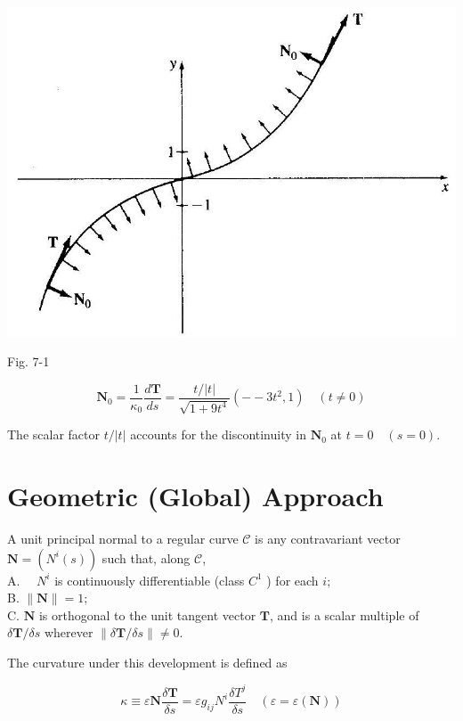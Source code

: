 \documentclass[10pt]{article}
\begin{document}
\begin{center}
\includegraphics[max width=\textwidth]{2024_04_03_41f90be4f896e21f0dc9g-096}
\end{center}

Fig. 7-1

$$
\mathbf{N}_{0}=\frac{1}{\kappa_{0}} \frac{d \mathbf{T}}{d s}=\frac{t /|t|}{\sqrt{1+9 t^{4}}}\left(--3 t^{2}, 1\right) \quad(t \neq 0)
$$

The scalar factor $t /|t|$ accounts for the discontinuity in $\mathbf{N}_{0}$ at $t=0 \quad(s=0)$.

\section*{Geometric (Global) Approach}
A unit principal normal to a regular curve $\mathscr{C}$ is any contravariant vector $\mathbf{N}=\left(N^{i}(s)\right)$ such that, along $\mathscr{C}$,\\
A. $\quad N^{i}$ is continuously differentiable (class $C^{1}$ ) for each $i$;\\
B. $\|\mathbf{N}\|=1$;\\
C. $\mathbf{N}$ is orthogonal to the unit tangent vector $\mathbf{T}$, and is a scalar multiple of $\delta \mathbf{T} / \delta s$ wherever $\|\delta \mathbf{T} / \delta s\| \neq 0$.

The curvature under this development is defined as


\begin{equation*}
\kappa \equiv \varepsilon \mathbf{N} \frac{\delta \mathbf{T}}{\delta s}=\varepsilon g_{i j} N^{i} \frac{\delta T^{j}}{\delta s} \quad(\varepsilon=\varepsilon(\mathbf{N})) \tag{7.8}
\end{equation*}
\end{document}
